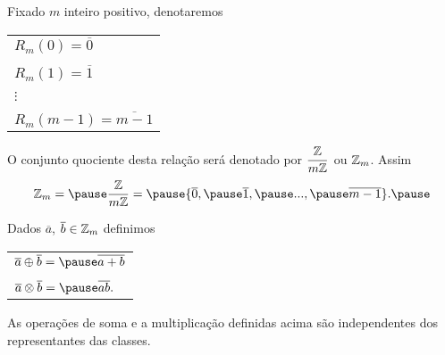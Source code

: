 \documentclass{beamer}
\begin{document}
    \begin{frame}
        \begin{observacao}
        Fixado $m$ inteiro positivo, \pause denotaremos\pause
        \begin{center}
            \begin{tabular}{l}
                $R_m(0) = \overline{0}$\pause \\
                \\
                $R_m(1) = \overline1$\pause \\
                \\
                $\vdots$\\
                \\
                $R_m(m-1) = \overline{m-1}$\pause
            \end{tabular}
        \end{center}

        O conjunto quociente \pause desta relação será denotado por $\displaystyle\frac{\mathbb{Z}}{m\mathbb{Z}}$ \pause ou $\mathbb{Z}_m$. \pause Assim\pause
        \[
            \z_m = \pause \displaystyle\frac{\z}{m\z} = \pause \{\overline{0}, \pause \overline1, \pause ..., \pause \overline{m-1}\}.\pause
        \]
        \end{observacao}
    \end{frame}

    \begin{frame}
        \begin{definicao}
            Dados $\overline{a}$, $\overline{b} \in \mathbb{Z}_m$ definimos\pause
            \begin{center}
                \begin{tabular}{l}
                    $\overline{a}\oplus\overline{b} = \pause \overline{a + b}\label{soma_modulo_m}$\pause \\
                    \\
                    $\overline{a}\otimes\overline{b} = \pause \overline{ab}.\label{multiplicacao_modulo_m}$\pause
                \end{tabular}
            \end{center}
        \end{definicao}

        \begin{proposicao}
            As operações de soma \pause e a multiplicação \pause definidas acima são independentes dos representantes das classes.
        \end{proposicao}
    \end{frame}
\end{document}
